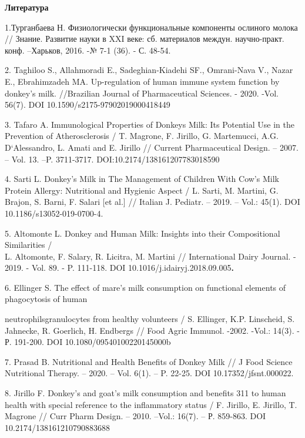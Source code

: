 \begin{center}
{\bfseries Литература}
\end{center}

\begin{noparindent}
1.Турганбаева Н. Физиологически функциональные компоненты ослиного
молока // Знание. Развитие науки в XXI веке: сб. материалов междун.
научно-практ. конф. --Харьков, 2016. -№ 7-1 (36). - С. 48-54.

2. Taghiloo S., Allahmoradi E., Sadeghian-Kiadehi SF., Omrani-Nava V.,
Nazar E., Ebrahimzadeh MA. Up-regulation of human immune system function
by donkey's milk. //Brazilian Journal of Pharmaceutical Sciences. -
2020. -Vol. 56(7). DOI 10.1590/s2175-97902019000418449

3. Tafaro A. Immunological Properties of Donkeys Milk: Its Potential Use
in the Prevention of Atherosclerosis / T. Magrone, F. Jirillo, G.
Martemucci, A.G. D`Alessandro, L. Amati and E. Jirillo // Current
Pharmaceutical Design. -- 2007. -- Vol. 13. --P. 3711-3717.
DOI:10.2174/138161207783018590

4. Sarti L. Donkey's Milk in The Management of Children With Cow's Milk
Protein Allergy: Nutritional and Hygienic Aspect / L. Sarti, M. Martini,
G. Brajon, S. Barni, F. Salari {[}et al.{]} // Italian J. Pediatr. --
2019. -- Vol.: 45(1). DOI 10.1186/s13052-019-0700-4.

5. Altomonte L. Donkey and Human Milk: Insights into their Compositional
Similarities /\\
L. Altomonte, F. Salary, R. Licitra, M. Martini // International Dairy
Journal. - 2019. - Vol. 89. - P. 111-118. DOI
10.1016/j.idairyj.2018.09.005{\bfseries .}

6. Ellinger S. The effect of mare's milk consumption on functional
elements of phagocytosis of human

neutrophilsgranulocytes from healthy
volunteers / S. Ellinger, K.P. Linscheid, S. Jahnecke, R. Goerlich, H.
Endbergs // Food Agric Immunol. -2002. -Vol.: 14(3). - Р. 191-200. DOI
10.1080/09540100220145000b

7. Prasad B. Nutritional and Health Benefits of Donkey Milk // J Food
Science Nutritional Therapy. -- 2020. -- Vol. 6(1). -- P. 22-25. DOI
10.17352/jfsnt.000022.

8. Jirillo F. Donkey's and goat's milk consumption and benefits 311 to
human health with special reference to the inflammatory status / F.
Jirillo, E. Jirillo, T. Magrone // Curr Pharm Design. -- 2010. --Vol.:
16(7). -- Р. 859-863. DOI 10.2174/138161210790883688


\end{noparindent}
